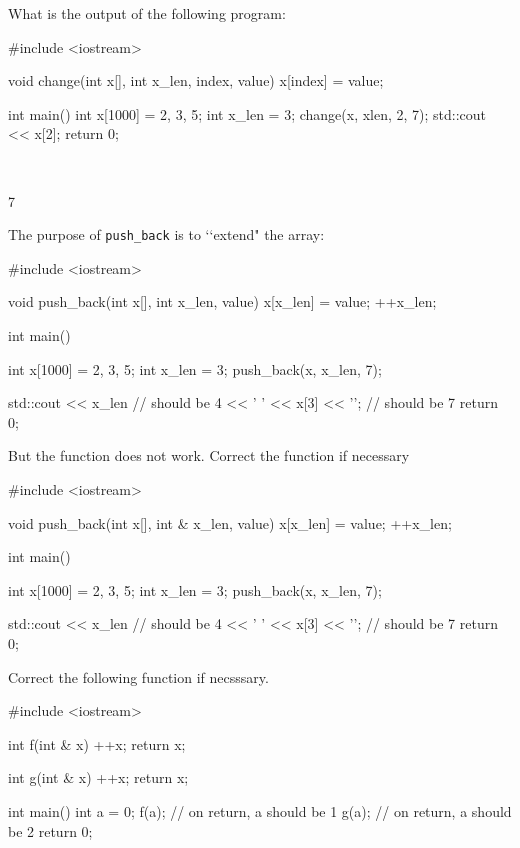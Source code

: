 

\nextq
What is the output of the following program:
\begin{console}[fontsize=\footnotesize]
#include <iostream>

void change(int x[], int x_len, index, value)
{
    x[index] = value;
}

int main()
{
    int x[1000] = {2, 3, 5};
    int x_len = 3;
    change(x, xlen, 2, 7);
    std::cout << x[2];
    return 0;
}
\end{console}
\\
\ANSWER
\begin{answercode}
7
\end{answercode}

\nextq
The purpose of \verb!push_back! is to \lq\lq extend" the array:
\begin{console}[fontsize=\footnotesize]
#include <iostream>

void push_back(int x[], int x_len, value)
{
    x[x_len] = value;
    ++x_len;
}

int main()
{
    int x[1000] = {2, 3, 5};
    int x_len = 3;
    push_back(x, x_len, 7);

    std::cout << x_len           // should be 4
              << ' '
              << x[3] << '\n';   // should be 7
    return 0;
}
\end{console}
But the function does not work.
Correct the function if necessary
\\
\ANSWER
\begin{answercode}
#include <iostream>

void push_back(int x[], int & x_len, value)
{
    x[x_len] = value;
    ++x_len;
}

int main()
{
    int x[1000] = {2, 3, 5};
    int x_len = 3;
    push_back(x, x_len, 7);

    std::cout << x_len           // should be 4
              << ' '
              << x[3] << '\n';   // should be 7
    return 0;
}
\end{answercode}

\nextq
Correct the following function if necsssary.
\\
\ANSWER
\begin{answercode}
#include <iostream>

int f(int & x)
{
    ++x;
    return x;
}

int g(int & x)
{
    ++x;
    return x;
}

int main()
{
    int a = 0;
    f(a);      // on return, a should be 1
    g(a);      // on return, a should be 2
    return 0;
}
\end{answercode}

